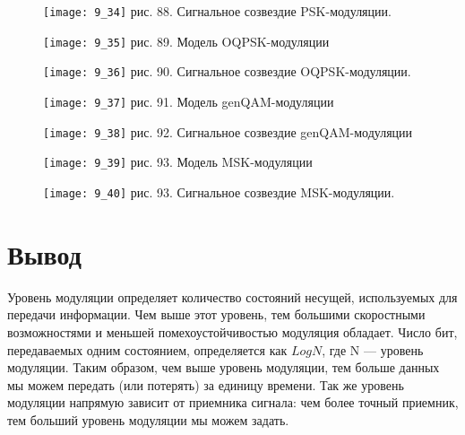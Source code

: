 \documentclass[10pt,a4paper]{report}
\begin{document}
\begin{figure}
\begin{center}
\texttt{[image: 9\_34]}\newline
рис. 88. Сигнальное созвездие PSK-модуляции.\newline
\end{center}
\end{figure}
\begin{figure}
\begin{center}
\texttt{[image: 9\_35]}\newline
рис. 89. Модель OQPSK-модуляции\newline
\end{center}
\end{figure}
\begin{figure}
\begin{center}
\texttt{[image: 9\_36]}\newline
рис. 90. Сигнальное созвездие OQPSK-модуляции.\newline
\end{center}
\end{figure}
\begin{figure}
\begin{center}
\texttt{[image: 9\_37]}\newline
рис. 91. Модель genQAM-модуляции\newline
\end{center}
\end{figure}
\begin{figure}
\begin{center}
\texttt{[image: 9\_38]}\newline
рис. 92. Сигнальное созвездие genQAM-модуляции\newline
\end{center}
\end{figure}
\begin{figure}
\begin{center}
\texttt{[image: 9\_39]}\newline
рис. 93. Модель MSK-модуляции\newline
\end{center}
\end{figure}
\begin{figure}
\begin{center}
\texttt{[image: 9\_40]}\newline
рис. 93. Сигнальное созвездие MSK-модуляции.\newline
\end{center}
\end{figure}
\section{Вывод}
Уровень модуляции определяет количество состояний несущей, используемых для передачи информации. Чем выше этот уровень, тем большими скоростными возможностями и меньшей помехоустойчивостью модуляция обладает. Число бит, передаваемых одним состоянием, определяется как $Log N$, где N — уровень модуляции. Таким образом, чем выше уровень модуляции, тем больше данных мы можем передать (или потерять) за единицу времени. Так же уровень модуляции напрямую зависит от приемника сигнала: чем более точный приемник, тем больший уровень модуляции мы можем задать.
\end{document}
